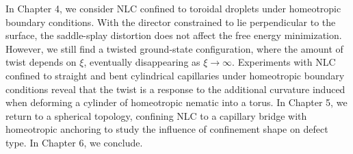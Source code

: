 In Chapter 4, we consider NLC confined to toroidal droplets under homeotropic boundary conditions.
With the director constrained to lie perpendicular to the surface, the saddle-splay distortion does not affect the free energy minimization.
However, we still find a twisted ground-state configuration, where the amount of twist depends on $\xi$, eventually disappearing as $\xi \rightarrow \infty$.
Experiments with NLC confined to straight and bent cylindrical capillaries under homeotropic boundary conditions reveal that the twist is a response to the additional curvature induced when deforming a cylinder of homeotropic nematic into a torus.
In Chapter 5, we return to a spherical topology, confining NLC to a capillary bridge with homeotropic anchoring to study the influence of confinement shape on defect type.
In Chapter 6, we conclude.
